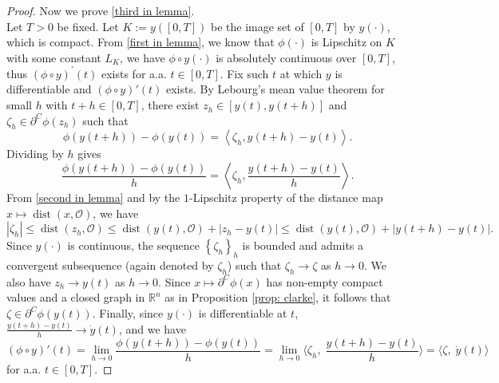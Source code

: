 \documentclass[12pt]{amsart}
\numberwithin{equation}{section}
\theoremstyle{plain}
\begin{document}
\begin{proof}
Now we prove \ref{third in lemma}. \\ 
Let $T>0$ be fixed. Let $K:=y([0, T])$ be the image set of $[0,T]$ by $y(\cdot)$, which is compact. From \ref{first in lemma}, we know that $\phi(\cdot)$ is Lipschitz on $K$ with some constant $L_K$, we have $\phi \circ y(\cdot)$ is absolutely continuous over $[0, T]$, thus $(\phi \circ y)^{\prime}(t)$ exists for a.a. $t\in[0, T]$.  Fix such  $t$ at which $y$ is differentiable and $(\phi\circ y)'(t)$ exists.
By Lebourg's mean value theorem  \cite[Chapter 2, Theorem 2.4, p.75]{clarke1998nonsmooth} for small $h$ with $t+h\in[0,T]$, there exist $z_h\in [y(t),y(t+h)]$ and $\zeta_h\in \partial^C\phi(z_h)$ such that
\begin{equation*}
    \phi(y(t+h))-\phi(y(t))=\left\langle\zeta_h, y(t+h)-y(t)\right\rangle.
\end{equation*}
Dividing by $h$ gives
\begin{equation*}
    \frac{\phi(y(t+h))-\phi(y(t))}{h}=\left\langle \zeta_h, \frac{y(t+h)-y(t)}{h}\right\rangle.
\end{equation*}
 From \ref{second in lemma} and by the $1$-Lipschitz property of the distance map $x \mapsto \operatorname{dist}(x, \mathscr{O})$, we have 
\begin{equation*}
    |\zeta_h| \leq \operatorname{dist}\left(z_h, \mathscr{O}\right) \leq \operatorname{dist}(y(t), \mathscr{O})+\left|z_h-y(t)\right|\leq \operatorname{dist}(y(t),\mathscr{O})+|y(t+h)-y(t)|.
\end{equation*}
Since $y(\cdot)$ is continuous, the sequence $\left\{\zeta_h\right\}_{h}$ is bounded and admits a convergent subsequence (again denoted by $\zeta_{h}$) such that $\zeta_h\to \zeta$ as $h \rightarrow 0$. 
We also have $z_h\to y(t)$ as  $h \rightarrow 0$. Since  $x\mapsto\partial^C\phi(x)$ has non-empty compact values and a closed graph in $\mathbb{R}^{n}$ as in Proposition \ref{prop: clarke}, it follows that $\zeta \in \partial^C \phi(y(t))$. Finally, since $y(\cdot)$ is differentiable at $t$, $\frac{y(t+h)-y(t)}{h} \rightarrow \dot{y}(t)$, and we have 
\begin{equation*}
    (\phi\circ y)'(t)
    =\lim_{h\to 0}\frac{\phi(y(t+h))-\phi(y(t))}{h}
    =\lim_{h\to 0}\Big\langle \zeta_h,\; \frac{y(t+h)-y(t)}{h}\Big\rangle
    =\big\langle \zeta,\; \dot y(t)\big\rangle
\end{equation*}
for a.a. $t\in[0,T]$.
\end{proof}
\end{document}
